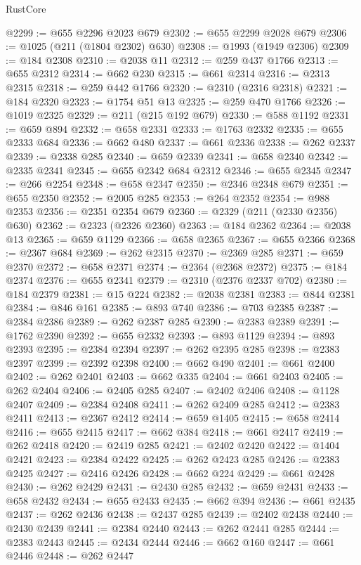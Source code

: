 \begin{lexlean}{RustCore}
\begin{coremodule}
@2299 := @655 @2296 @2023 @679
@2302 := @655 @2299 @2028 @679
@2306 := @1025 (@211 (@1804 @2302) @630)
@2308 := @1993 (@1949 @2306)
@2309 := @184 @2308
@2310 := @2038 @11
@2312 := @259 @437 @1766
@2313 := @655 @2312
@2314 := @662 @230
@2315 := @661 @2314
@2316 := @2313 @2315
@2318 := @259 @442 @1766
@2320 := @2310 (@2316 @2318)
@2321 := @184 @2320
@2323 := @1754 @51 @13
@2325 := @259 @470 @1766
@2326 := @1019 @2325
@2329 := @211 (@215 @192 @679)
@2330 := @588 @1192
@2331 := @659 @894
@2332 := @658 @2331
@2333 := @1763 @2332
@2335 := @655 @2333 @684
@2336 := @662 @480
@2337 := @661 @2336
@2338 := @262 @2337
@2339 := @2338 @285
@2340 := @659 @2339
@2341 := @658 @2340
@2342 := @2335 @2341
@2345 := @655 @2342 @684 @2312
@2346 := @655 @2345
@2347 := @266 @2254
@2348 := @658 @2347
@2350 := @2346 @2348 @679
@2351 := @655 @2350
@2352 := @2005 @285
@2353 := @264 @2352
@2354 := @988 @2353
@2356 := @2351 @2354 @679
@2360 := @2329 (@211 (@2330 @2356) @630)
@2362 := @2323 (@2326 @2360)
@2363 := @184 @2362
@2364 := @2038 @13
@2365 := @659 @1129
@2366 := @658 @2365
@2367 := @655 @2366
@2368 := @2367 @684
@2369 := @262 @2315
@2370 := @2369 @285
@2371 := @659 @2370
@2372 := @658 @2371
@2374 := @2364 (@2368 @2372)
@2375 := @184 @2374
@2376 := @655 @2341
@2379 := @2310 (@2376 @2337 @702)
@2380 := @184 @2379
@2381 := @15 @224
@2382 := @2038 @2381
@2383 := @844 @2381
@2384 := @846 @161
@2385 := @893 @740
@2386 := @703 @2385
@2387 := @2384 @2386
@2389 := @262 @2387 @285
@2390 := @2383 @2389
@2391 := @1762 @2390
@2392 := @655 @2332
@2393 := @893 @1129
@2394 := @893 @2393
@2395 := @2384 @2394
@2397 := @262 @2395 @285
@2398 := @2383 @2397
@2399 := @2392 @2398
@2400 := @662 @490
@2401 := @661 @2400
@2402 := @262 @2401
@2403 := @662 @335
@2404 := @661 @2403
@2405 := @262 @2404
@2406 := @2405 @285
@2407 := @2402 @2406
@2408 := @1128 @2407
@2409 := @2384 @2408
@2411 := @262 @2409 @285
@2412 := @2383 @2411
@2413 := @2367 @2412
@2414 := @659 @1405
@2415 := @658 @2414
@2416 := @655 @2415
@2417 := @662 @384
@2418 := @661 @2417
@2419 := @262 @2418
@2420 := @2419 @285
@2421 := @2402 @2420
@2422 := @1404 @2421
@2423 := @2384 @2422
@2425 := @262 @2423 @285
@2426 := @2383 @2425
@2427 := @2416 @2426
@2428 := @662 @224
@2429 := @661 @2428
@2430 := @262 @2429
@2431 := @2430 @285
@2432 := @659 @2431
@2433 := @658 @2432
@2434 := @655 @2433
@2435 := @662 @394
@2436 := @661 @2435
@2437 := @262 @2436
@2438 := @2437 @285
@2439 := @2402 @2438
@2440 := @2430 @2439
@2441 := @2384 @2440
@2443 := @262 @2441 @285
@2444 := @2383 @2443
@2445 := @2434 @2444
@2446 := @662 @160
@2447 := @661 @2446
@2448 := @262 @2447

\end{coremodule}
\end{lexlean}
